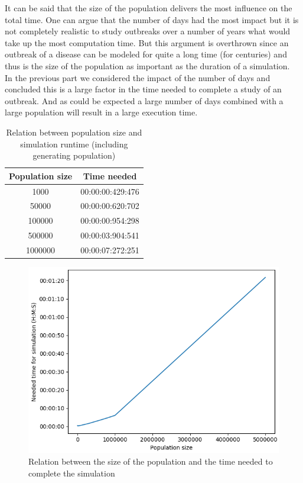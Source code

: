 \documentclass[runningheads]{llncs}
\begin{document}
It can be said that the size of the population delivers the most influence on the total time. One can argue that the number of days had the most impact but it is not completely realistic to study outbreaks over a number of years what would take up the most computation time. But this argument is overthrown since an outbreak of a disease can be modeled for quite a long time (for centuries) and thus is the size of the population as important as the duration of a simulation.\\

In the previous part we considered the impact of the number of days and concluded this is a large factor in the time needed to complete a study of an outbreak. And as could be expected a large number of days combined with a large population will result in a large execution time.

\begin{table}
	\caption{Relation between population size and simulation runtime (including generating population)}
	\begin{center}
		\begin{tabular}{ | c | c |}
			\hline
			Population size & Time needed \\ \hline
			1000 & 00:00:00:429:476 \\ \hline
			50000 & 00:00:00:620:702 \\ \hline
			100000 & 00:00:00:954:298 \\ \hline
			500000 & 00:00:03:904:541 \\ \hline
			1000000 & 00:00:07:272:251 \\
			\hline	
		\end{tabular}
	\end{center} 
\end{table}
\begin{figure}
	\includegraphics[scale=0.65]{performance_population.png}
	\caption{Relation between the size of the population and the time needed to complete the simulation} 
\end{figure}
\newpage
\end{document}
